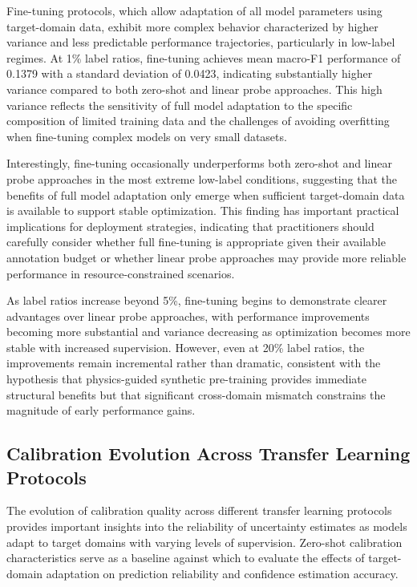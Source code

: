 \documentclass[journal]{IEEEtran}
\begin{document}
Fine-tuning protocols, which allow adaptation of all model parameters using target-domain data, exhibit more complex behavior characterized by higher variance and less predictable performance trajectories, particularly in low-label regimes. At 1\% label ratios, fine-tuning achieves mean macro-F1 performance of 0.1379 with a standard deviation of 0.0423, indicating substantially higher variance compared to both zero-shot and linear probe approaches. This high variance reflects the sensitivity of full model adaptation to the specific composition of limited training data and the challenges of avoiding overfitting when fine-tuning complex models on very small datasets.

Interestingly, fine-tuning occasionally underperforms both zero-shot and linear probe approaches in the most extreme low-label conditions, suggesting that the benefits of full model adaptation only emerge when sufficient target-domain data is available to support stable optimization. This finding has important practical implications for deployment strategies, indicating that practitioners should carefully consider whether full fine-tuning is appropriate given their available annotation budget or whether linear probe approaches may provide more reliable performance in resource-constrained scenarios.

As label ratios increase beyond 5\%, fine-tuning begins to demonstrate clearer advantages over linear probe approaches, with performance improvements becoming more substantial and variance decreasing as optimization becomes more stable with increased supervision. However, even at 20\% label ratios, the improvements remain incremental rather than dramatic, consistent with the hypothesis that physics-guided synthetic pre-training provides immediate structural benefits but that significant cross-domain mismatch constrains the magnitude of early performance gains.

\subsection{Calibration Evolution Across Transfer Learning Protocols}

The evolution of calibration quality across different transfer learning protocols provides important insights into the reliability of uncertainty estimates as models adapt to target domains with varying levels of supervision. Zero-shot calibration characteristics serve as a baseline against which to evaluate the effects of target-domain adaptation on prediction reliability and confidence estimation accuracy.
\end{document}
